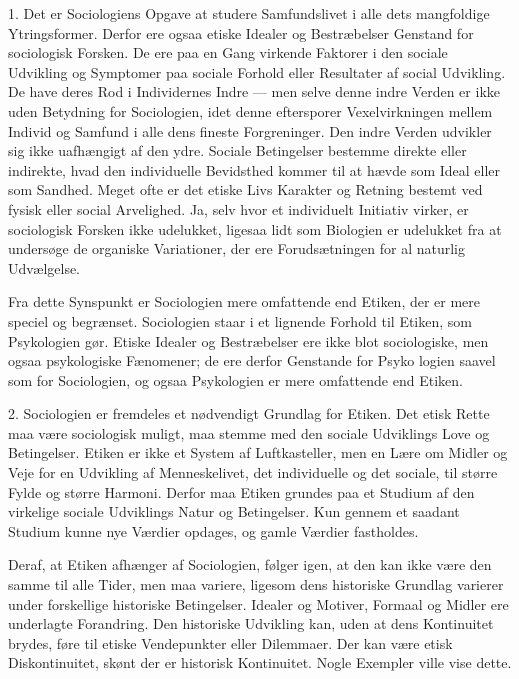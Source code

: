 \documentclass[12pt,a4paper,openany]{book}
\newcommand{\opage}[1]{\marginnote{\footnotesize\textit{[#1]}}}
\begin{document}
1. Det er Sociologiens Opgave at studere Samfundslivet
i alle dets mangfoldige Ytringsformer. Derfor ere ogsaa etiske
Idealer og Bestræbelser Genstand for sociologisk Forsken. De
ere paa en Gang virkende Faktorer i den sociale Udvikling og
Symptomer paa sociale Forhold eller Resultater af social Udvikling.
De have deres Rod i Individernes Indre --- men selve
denne indre Verden er ikke uden Betydning for Sociologien,
idet denne eftersporer Vexelvirkningen mellem Individ og Samfund
i alle dens fineste Forgreninger. Den indre Verden udvikler
sig ikke uafhængigt af den ydre. Sociale Betingelser
bestemme direkte eller indirekte, hvad den individuelle Bevidsthed
kommer til at hævde som Ideal eller som Sandhed.
Meget ofte er det etiske Livs Karakter og Retning bestemt
ved fysisk eller social Arvelighed. Ja, selv hvor et individuelt
Initiativ virker, er sociologisk Forsken ikke udelukket, ligesaa
lidt som Biologien er udelukket fra at undersøge de organiske
Variationer, der ere Forudsætningen for al naturlig Udvælgelse.

Fra dette Synspunkt er Sociologien mere omfattende end
Etiken, der er mere speciel og begrænset. Sociologien staar i
et lignende Forhold til Etiken, som Psykologien gør. Etiske
Idealer og Bestræbelser ere ikke blot sociologiske, men ogsaa
psykologiske Fænomener; de ere derfor Genstande for Psyko%
\setcounter{footnote}{0}%
\opage{69}logien saavel som for Sociologien, og ogsaa Psykologien er
mere omfattende end Etiken.

2. Sociologien er fremdeles et nødvendigt Grundlag for
Etiken. Det etisk Rette maa være sociologisk muligt, maa
stemme med den sociale Udviklings Love og Betingelser. Etiken
er ikke et System af Luftkasteller, men en Lære om Midler
og Veje for en Udvikling af Menneskelivet, det individuelle og
det sociale, til større Fylde og større Harmoni. Derfor maa
Etiken grundes paa et Studium af den virkelige sociale Udviklings
Natur og Betingelser. Kun gennem et saadant Studium
kunne nye Værdier opdages, og gamle Værdier fastholdes.


Deraf, at Etiken afhænger af Sociologien, følger igen, at
den kan ikke være den samme til alle Tider, men maa variere,
ligesom dens historiske Grundlag varierer under forskellige
historiske Betingelser. Idealer og Motiver, Formaal og Midler
ere underlagte Forandring. Den historiske Udvikling kan,
uden at dens Kontinuitet brydes, føre til etiske Vendepunkter
eller Dilemmaer. Der kan være etisk Diskontinuitet, skønt
der er historisk Kontinuitet. Nogle Exempler ville vise dette.
\end{document}
